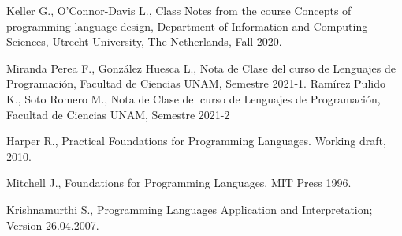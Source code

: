 \documentclass[12pt]{extarticle}
\begin{document}
\begin{thebibliography}{9}
Keller G., O'Connor-Davis L., Class Notes from the course Concepts of programming language design, Department of Information and Computing Sciences, Utrecht University, The Netherlands, Fall 2020.

Miranda Perea F., González Huesca L., Nota de Clase del curso de Lenguajes de Programación, Facultad de Ciencias UNAM, Semestre 2021-1.
Ramírez Pulido K., Soto Romero M., Nota de Clase del curso de Lenguajes de Programación, Facultad de Ciencias UNAM, Semestre 2021-2

Harper R., Practical Foundations for Programming Languages. Working draft, 2010.

Mitchell J., Foundations for Programming Languages. MIT Press 1996.

Krishnamurthi S., Programming Languages Application and Interpretation; Version 26.04.2007.


\end{thebibliography}
\end{document}
